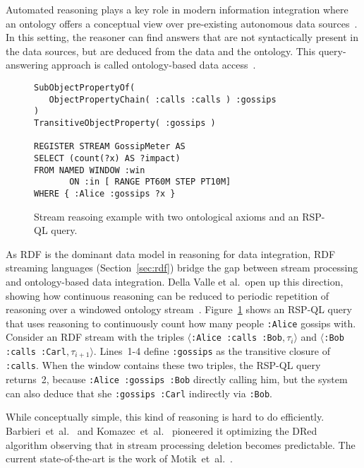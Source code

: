 Automated reasoning plays a key role in modern information integration where an ontology offers a conceptual view over
pre-existing autonomous data sources~\cite{DBLP:conf/pods/Lenzerini02}. In this setting, the reasoner
can find answers that are not syntactically present in the data
sources, but are deduced from the data and the ontology.  This
query-answering approach is called ontology-based data
access~\cite{DBLP:journals/jods/PoggiLCGLR08}.

\begin{figure}[!h]
\begin{lstlisting}[language=rsp-ql]
SubObjectPropertyOf(
   ObjectPropertyChain( :calls :calls ) :gossips
)
TransitiveObjectProperty( :gossips )

REGISTER STREAM GossipMeter AS
SELECT (count(?x) AS ?impact)
FROM NAMED WINDOW :win
       ON :in [ RANGE PT60M STEP PT10M]
WHERE { :Alice :gossips ?x }
\end{lstlisting}
\vspace*{-4mm}
\caption{\label{fig:sr}Stream reasoing example with two ontological axioms and an RSP-QL query.}
\end{figure}

As RDF is the dominant data model in reasoning for data integration,
RDF streaming languages (Section~\ref{sec:rdf}) bridge the gap between
stream processing and ontology-based data integration.  Della Valle et
al.\ open up this direction, showing how continuous
reasoning can be reduced to periodic repetition of
reasoning over a windowed ontology
stream~\cite{DBLP:conf/fis/ValleCBBC08}.  Figure~\ref{fig:sr} shows an
RSP-QL query that uses reasoning to continuously count how many people
\lstinline{:Alice} gossips with. Consider an RDF stream with the
triples \mbox{$\langle$\lstinline{:Alice :calls :Bob}$,\tau_i\rangle$}
and \mbox{$\langle$\lstinline{:Bob :calls :Carl}$,\tau_{i+1}\rangle$}.
\mbox{Lines 1-4} define \lstinline{:gossips} as the transitive closure
of \lstinline{:calls}. When the window contains these two triples, the
RSP-QL query returns~2, because \lstinline{:Alice :gossips :Bob}
directly calling him, but the system can also deduce that she
\lstinline{:gossips :Carl} indirectly via \lstinline{:Bob}.

While conceptually simple, this kind of reasoning is hard to do
efficiently. Barbieri~et~al.~\cite{DBLP:conf/esws/BarbieriBCVG10} and Komazec~et~al.~\cite{DBLP:conf/debs/KomazecCF12} pioneered it optimizing the DRed algorithm observing that in stream processing
deletion becomes predictable. The current state-of-the-art is the
work of Motik~et~al.~\cite{DBLP:conf/aaai/MotikNPH15a}. 

